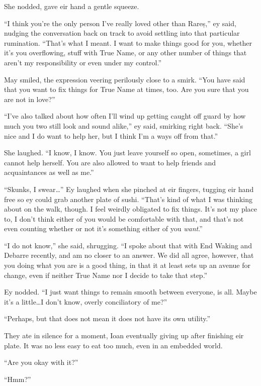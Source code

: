 She nodded, gave eir hand a gentle squeeze.

``I think you're the only person I've really loved other than Rareș,'' ey said, nudging the conversation back on track to avoid settling into that particular rumination. ``That's what I meant. I want to make things good for you, whether it's you overflowing, stuff with True Name, or any other number of things that aren't my responsibility or even under my control.''

May smiled, the expression veering perilously close to a smirk. ``You have said that you want to fix things for True Name at times, too. Are you sure that you are not in love?''

``I've also talked about how often I'll wind up getting caught off guard by how much you two still look and sound alike,'' ey said, smirking right back. ``She's nice and I do want to help her, but I think I'm a ways off from that.''

She laughed. ``I know, I know. You just leave yourself so open, sometimes, a girl cannot help herself. You are also allowed to want to help friends and acquaintances as well as me.''

``Skunks, I swear\ldots{}'' Ey laughed when she pinched at eir fingers, tugging eir hand free so ey could grab another plate of sushi. ``That's kind of what I was thinking about on the walk, though. I feel weirdly obligated to fix things. It's not my place to, I don't think either of you would be comfortable with that, and that's not even counting whether or not it's something either of you \emph{want}.''

``I do not know,'' she said, shrugging. ``I spoke about that with End Waking and Debarre recently, and am no closer to an answer. We did all agree, however, that you doing what you are is a good thing, in that it at least sets up an avenue for change, even if neither True Name nor I decide to take that step.''

Ey nodded. ``I just want things to remain smooth between everyone, is all. Maybe it's a little\ldots I don't know, overly conciliatory of me?''

``Perhaps, but that does not mean it does not have its own utility.''

They ate in silence for a moment, Ioan eventually giving up after finishing eir plate. It was no less easy to eat too much, even in an embedded world.

``Are you okay with it?''

``Hmm?''

